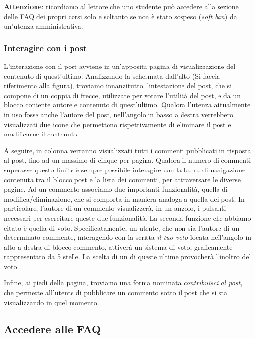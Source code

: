 \documentclass [a4paper,11pt]{book}
\begin{document}
\medskip

\textbf{\underline{Attenzione}}: ricordiamo al lettore che uno studente può accedere alla sezione delle FAQ dei propri corsi solo e soltanto se non è stato sospeso (\emph{soft ban}) da un'utenza amministrativa.

\medskip

\subsubsection{Interagire con i post}

L'interazione con il post avviene in un'apposita pagina di visualizzazione del contenuto di quest'ultimo. Analizzando la schermata dall'alto (Si faccia riferimento alla figura), troviamo innanzitutto l'intestazione del post, che si compone di un coppia di frecce, utilizzate per votare l'utilità del post, e da un blocco contente autore e contenuto di quest'ultimo. 
Qualora l'utenza attualmente in uso fosse anche l'autore del post, nell'angolo in basso a destra verrebbero visualizzati due icone che permettono rispettivamente di eliminare il post e modificarne il contenuto.

A seguire, in colonna verranno visualizzati tutti i commenti pubblicati in risposta al post, fino ad un massimo di cinque per pagina. Qualora il numero di commenti superasse questo limite è sempre possibile interagire con la barra di navigazione contenuta tra il blocco post e la lista dei commenti, per attraversare le diverse pagine. 
Ad un commento associamo due importanti funzionalità, quella di modifica/eliminazione, che si comporta in maniera analoga a quella dei post. In particolare, l'autore di un commento visualizzerà, in un angolo, i pulsanti necessari per esercitare queste due funzionalità.
La seconda funzione che abbiamo citato è quella di voto. Specificatamente, un utente, che non sia l'autore di un determinato commento, interagendo con la scritta \emph{il tuo voto} locata nell'angolo in alto a destra di blocco commento, attiverà un sistema di voto, graficamente rappresentato da 5 stelle. La scelta di un di queste ultime provocherà l'inoltro del voto.

Infine, ai piedi della pagina, troviamo una forma nominata \emph{contribuisci al post}, che permette all'utente di pubblicare un commento sotto il post che si sta visualizzando in quel momento.
\medskip

\subsection{Accedere alle FAQ}
\end{document}
